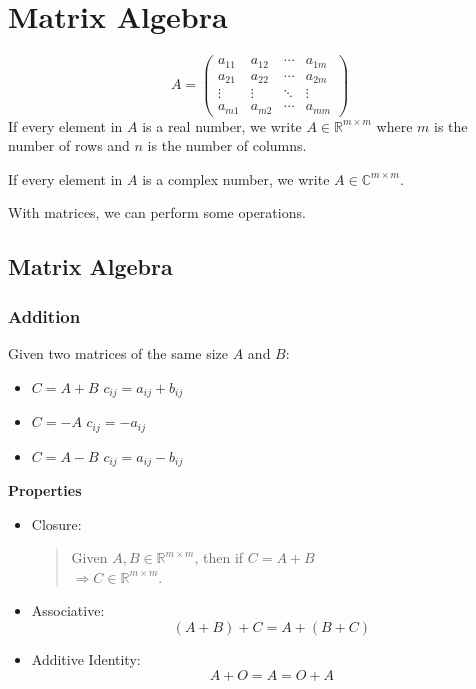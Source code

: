 \chapter[short]{Matrix Algebra}


\[
A = \begin{pmatrix}
a_{11} & a_{12} & \cdots & a_{1m} \\
a_{21} & a_{22} & \cdots & a_{2m} \\
\vdots & \vdots & \ddots & \vdots \\
a_{m1} & a_{m2} & \cdots & a_{mm}
\end{pmatrix}
\]
If every element in $A$ is a real number, we write $A \in \mathbb{R}^{m \times m}$ where $m$ is the number of rows and $n$ is the number of columns.

If every element in $A$ is a complex number, we write $A \in \mathbb{C}^{m \times m}$.

With matrices, we can perform some operations.

\section{Matrix Algebra}

\subsection{Addition}
Given two matrices of the same size $A$ and $B$:
\begin{itemize}
    \item $C = A + B$ \quad $c_{ij} = a_{ij} + b_{ij}$
    \item $C = -A$ \quad $c_{ij} = -a_{ij}$
    \item $C = A - B$ \quad $c_{ij} = a_{ij} - b_{ij}$
\end{itemize}

\textbf{Properties}
\begin{itemize}
    \item Closure:
    \begin{quote}
    Given $A, B \in \mathbb{R}^{m \times m}$, then if $C = A + B$ \\
    $\Rightarrow C \in \mathbb{R}^{m \times m}$.
    \end{quote}
    
    \item Associative:
    \begin{equation*}
    (A + B) + C = A + (B + C)
    \end{equation*}
    
    \item Additive Identity:
    \begin{equation*}
    A + O = A = O + A
    \end{equation*}
\end{itemize}

